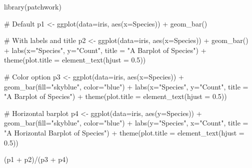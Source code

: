 \documentclass[
  letterpaper,
]{book}
\newenvironment{Shaded}{\begin{snugshade}}{\end{snugshade}}
\newcommand{\AttributeTok}[1]{\textcolor[rgb]{0.40,0.45,0.13}{#1}}
\newcommand{\CommentTok}[1]{\textcolor[rgb]{0.37,0.37,0.37}{#1}}
\newcommand{\FloatTok}[1]{\textcolor[rgb]{0.68,0.00,0.00}{#1}}
\newcommand{\FunctionTok}[1]{\textcolor[rgb]{0.28,0.35,0.67}{#1}}
\newcommand{\NormalTok}[1]{\textcolor[rgb]{0.00,0.23,0.31}{#1}}
\newcommand{\OtherTok}[1]{\textcolor[rgb]{0.00,0.23,0.31}{#1}}
\newcommand{\SpecialCharTok}[1]{\textcolor[rgb]{0.37,0.37,0.37}{#1}}
\newcommand{\StringTok}[1]{\textcolor[rgb]{0.13,0.47,0.30}{#1}}
\begin{document}
\begin{Shaded}
\begin{Highlighting}[]
\FunctionTok{library}\NormalTok{(patchwork)}

\CommentTok{\# Default}
\NormalTok{p1 }\OtherTok{\textless{}{-}} \FunctionTok{ggplot}\NormalTok{(}\AttributeTok{data=}\NormalTok{iris, }\FunctionTok{aes}\NormalTok{(}\AttributeTok{x=}\NormalTok{Species)) }\SpecialCharTok{+}
        \FunctionTok{geom\_bar}\NormalTok{()}

\CommentTok{\# With labels and title}
\NormalTok{p2 }\OtherTok{\textless{}{-}} \FunctionTok{ggplot}\NormalTok{(}\AttributeTok{data=}\NormalTok{iris, }\FunctionTok{aes}\NormalTok{(}\AttributeTok{x=}\NormalTok{Species)) }\SpecialCharTok{+}
        \FunctionTok{geom\_bar}\NormalTok{() }\SpecialCharTok{+}
        \FunctionTok{labs}\NormalTok{(}\AttributeTok{x=}\StringTok{"Species"}\NormalTok{, }\AttributeTok{y=}\StringTok{"Count"}\NormalTok{, }\AttributeTok{title =} \StringTok{"A Barplot of Species"}\NormalTok{) }\SpecialCharTok{+}
        \FunctionTok{theme}\NormalTok{(}\AttributeTok{plot.title =} \FunctionTok{element\_text}\NormalTok{(}\AttributeTok{hjust =} \FloatTok{0.5}\NormalTok{))}

\CommentTok{\# Color option}
\NormalTok{p3 }\OtherTok{\textless{}{-}} \FunctionTok{ggplot}\NormalTok{(}\AttributeTok{data=}\NormalTok{iris, }\FunctionTok{aes}\NormalTok{(}\AttributeTok{x=}\NormalTok{Species)) }\SpecialCharTok{+}
        \FunctionTok{geom\_bar}\NormalTok{(}\AttributeTok{fill=}\StringTok{"skyblue"}\NormalTok{, }\AttributeTok{color=}\StringTok{"blue"}\NormalTok{) }\SpecialCharTok{+}
        \FunctionTok{labs}\NormalTok{(}\AttributeTok{x=}\StringTok{"Species"}\NormalTok{, }\AttributeTok{y=}\StringTok{"Count"}\NormalTok{, }\AttributeTok{title =} \StringTok{"A Barplot of Species"}\NormalTok{) }\SpecialCharTok{+}
        \FunctionTok{theme}\NormalTok{(}\AttributeTok{plot.title =} \FunctionTok{element\_text}\NormalTok{(}\AttributeTok{hjust =} \FloatTok{0.5}\NormalTok{))}

\CommentTok{\# Horizontal barplot}
\NormalTok{p4 }\OtherTok{\textless{}{-}} \FunctionTok{ggplot}\NormalTok{(}\AttributeTok{data=}\NormalTok{iris, }\FunctionTok{aes}\NormalTok{(}\AttributeTok{y=}\NormalTok{Species)) }\SpecialCharTok{+}
        \FunctionTok{geom\_bar}\NormalTok{(}\AttributeTok{fill=}\StringTok{"skyblue"}\NormalTok{, }\AttributeTok{color=}\StringTok{"blue"}\NormalTok{) }\SpecialCharTok{+}
        \FunctionTok{labs}\NormalTok{(}\AttributeTok{y=}\StringTok{"Species"}\NormalTok{, }\AttributeTok{x=}\StringTok{"Count"}\NormalTok{, }\AttributeTok{title =} \StringTok{"A Horizontal Barplot of Species"}\NormalTok{) }\SpecialCharTok{+}
        \FunctionTok{theme}\NormalTok{(}\AttributeTok{plot.title =} \FunctionTok{element\_text}\NormalTok{(}\AttributeTok{hjust =} \FloatTok{0.5}\NormalTok{))}

\NormalTok{(p1 }\SpecialCharTok{+}\NormalTok{ p2)}\SpecialCharTok{/}\NormalTok{(p3 }\SpecialCharTok{+}\NormalTok{ p4)}
\end{Highlighting}
\end{Shaded}
\end{document}
